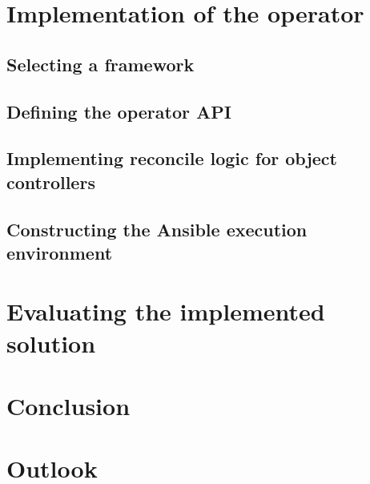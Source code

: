\documentclass[
	12pt, %
	a4paper,
	liststotoc, %
	bibtotoc, %
	pointlessnumbers, %
	headsepline, %
	footsepline, %
	oneside %
	]{scrbook} %
\begin{document}
\chapter{Implementation of the operator}
\label{ch:implementation}


\section{Selecting a framework}


\section{Defining the operator API}


\section{Implementing reconcile logic for object controllers}


\section{Constructing the Ansible execution environment}


\chapter{Evaluating the implemented solution}
\label{ch:evaluation}


\chapter{Conclusion}
\label{ch:outro}


\chapter{Outlook}
\label{ch:future}


\printbibliography


\thispagestyle{empty}
\end{document}

